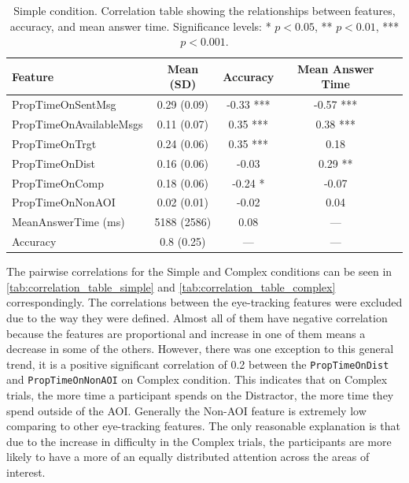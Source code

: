 \begin{table}[h!]
\centering
\begin{tabular}{|l|c|c|c|c|}
\hline
\textbf{Feature} & \textbf{Mean (SD)} & \textbf{Accuracy} & \textbf{Mean Answer Time} \\ \hline
PropTimeOnSentMsg & 0.29 (0.09) & -0.33 *** & -0.57 *** \\ \hline
PropTimeOnAvailableMsgs & 0.11 (0.07) & 0.35 *** & 0.38 *** \\ \hline
PropTimeOnTrgt & 0.24 (0.06) & 0.35 *** & 0.18 \\ \hline
PropTimeOnDist & 0.16 (0.06) & -0.03 & 0.29 ** \\ \hline
PropTimeOnComp & 0.18 (0.06) & -0.24 * & -0.07 \\ \hline
PropTimeOnNonAOI & 0.02 (0.01) & -0.02 & 0.04 \\ \hline
MeanAnswerTime (ms) & 5188 (2586) & 0.08 & --- \\ \hline
Accuracy & 0.8 (0.25) & --- & --- \\ \hline
\end{tabular}
\caption{Simple condition. Correlation table showing the relationships between features, accuracy, and mean answer time. Significance levels: * $p < 0.05$, ** $p < 0.01$, *** $p < 0.001$.}
\label{tab:correlation_table_simple}
\end{table}

The pairwise correlations for the Simple and Complex conditions can be seen in \autoref{tab:correlation_table_simple} and \autoref{tab:correlation_table_complex} correspondingly. The correlations between the eye-tracking features were excluded due to the way they were defined. Almost all of them have negative correlation because the features are proportional and increase in one of them means a decrease in some of the others. However, there was one exception to this general trend, it is a positive significant correlation of 0.2 between the \texttt{PropTimeOnDist} and \texttt{PropTimeOnNonAOI} on Complex condition. This indicates that on Complex trials, the more time a participant spends on the Distractor, the more time they spend outside of the AOI. Generally the Non-AOI feature is extremely low comparing to other eye-tracking features. The only reasonable explanation is that due to the increase in difficulty in the Complex trials, the participants are more likely to have a more of an equally distributed attention across the areas of interest.

